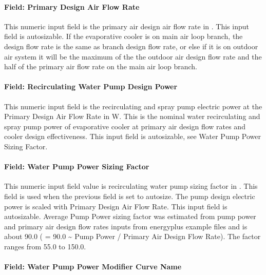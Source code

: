 \paragraph{Field: Primary Design Air Flow Rate}\label{field-primary-design-air-flow-rate}

This numeric input field is the primary air design air flow rate in \si{\volumeFlowRate}. This input field is autosizable. If the evaporative cooler is on main air loop branch, the design flow rate is the same as branch design flow rate, or else if it is on outdoor air system it will be the maximum of the the outdoor air design flow rate and the half of the primary air flow rate on the main air loop branch.

\paragraph{Field: Recirculating Water Pump Design Power}\label{field-recirculating-water-pump-design-power}

This numeric input field is the recirculating and spray pump electric power at the Primary Design Air Flow Rate in \si{\watt}.
This is the nominal water recirculating and spray pump power of evaporative cooler at primary air design flow rates and cooler design effectiveness.
This input field is autosizable, see Water Pump Power Sizing Factor.

\paragraph{Field: Water Pump Power Sizing Factor}\label{field-water-pump-power-sizing-factor}

This numeric input field value is recirculating water pump sizing factor in \si{\wattperVolumeFlowRate}.
This field is used when the previous field is set to autosize. The pump design electric power is scaled with Primary Design Air Flow Rate. This input field is autosizable.
Average Pump Power sizing factor was estimated from pump power and primary air design flow rates inputs from energyplus example files and
is about \SI{90.0}{\wattperVolumeFlowRate} ( = 90.0 \textasciitilde{} Pump Power / Primary Air Design Flow Rate). The factor ranges from 55.0 to \SI{150.0}{\wattperVolumeFlowRate}.

\paragraph{Field: Water Pump Power Modifier Curve Name}\label{field-water-pump-power-modifier-curve-name}

